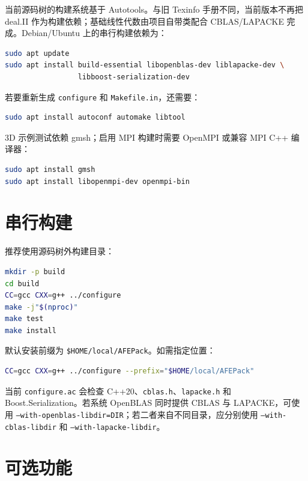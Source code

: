 \documentclass[UTF8,openany,zihao=-4,scheme=chinese]{ctexbook}
\newcommand{\file}[1]{\nolinkurl{#1}}
\newcommand{\cmd}[1]{\texttt{#1}}
\begin{document}
当前源码树的构建系统基于 Autotools。与旧 Texinfo 手册不同，当前版本不再把 deal.II 作为构建依赖；基础线性代数由项目自带类配合 CBLAS/LAPACKE 完成。Debian/Ubuntu 上的串行构建依赖为：

\begin{lstlisting}[language=bash]
sudo apt update
sudo apt install build-essential libopenblas-dev liblapacke-dev \
                 libboost-serialization-dev
\end{lstlisting}

若要重新生成 \file{configure} 和 \file{Makefile.in}，还需要：

\begin{lstlisting}[language=bash]
sudo apt install autoconf automake libtool
\end{lstlisting}

3D 示例测试依赖 gmsh\cite{gmsh2009}；启用 MPI 构建时需要 OpenMPI 或兼容 MPI C++ 编译器：

\begin{lstlisting}[language=bash]
sudo apt install gmsh
sudo apt install libopenmpi-dev openmpi-bin
\end{lstlisting}

\section{串行构建}

推荐使用源码树外构建目录：

\begin{lstlisting}[language=bash]
mkdir -p build
cd build
CC=gcc CXX=g++ ../configure
make -j"$(nproc)"
make test
make install
\end{lstlisting}

默认安装前缀为 \file{$HOME/local/AFEPack}。如需指定位置：

\begin{lstlisting}[language=bash]
CC=gcc CXX=g++ ../configure --prefix="$HOME/local/AFEPack"
\end{lstlisting}

当前 \file{configure.ac} 会检查 C++20、\file{cblas.h}、\file{lapacke.h} 和 Boost.Serialization。若系统 OpenBLAS 同时提供 CBLAS 与 LAPACKE，可使用 \cmd{--with-openblas-libdir=DIR}；若二者来自不同目录，应分别使用 \cmd{--with-cblas-libdir} 和 \cmd{--with-lapacke-libdir}。

\section{可选功能}
\end{document}
